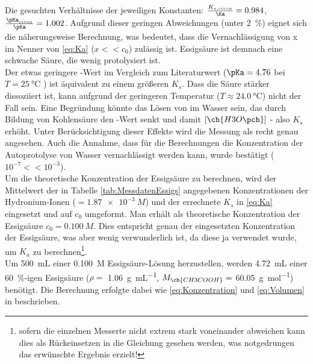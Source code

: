 \documentclass{article}
\begin{document}
         Die gesuchten Verhältnisse der jeweiligen Konstanten: $\frac{K_{s,circa}}{\Ka} = 0.984$, $\frac{\pKa _{circa}}{\pKa} = 1.002$. Aufgrund dieser geringen Abweichungen (unter \SI[mode=text]{2}{\percent}) eignet sich die näherungsweise Berechnung, was bedeutet, dass die Vernachlässigung von x im Nenner von \eqref{eq:Ka} ($x << c_{0}$) zulässig ist. Essigsäure ist demnach eine schwache Säure, die wenig protolysiert ist.\\
         
         Der etwas geringere \pKa-Wert im Vergleich zum Literaturwert ($\pKa = 4.76$ bei $T = \SI[mode=text]{25}{\degreeCelsius}$ \cite{Essigsaure}) ist äquivalent zu einem größeren $K_{s}$. Dass die Säure stärker dissoziiert ist, kann aufgrund der geringeren Temperatur ($T \approx \SI[mode=text]{24.0}{\degreeCelsius}$) nicht der Fall sein. Eine Begründung könnte das Lösen von  im Wasser sein, das durch Bildung von Kohlensäure den \pH-Wert senkt und damit $[\ch{H3O\pch}]$ - also $K_{s}$ erhöht. Unter Berücksichtigung dieser Effekte wird die Messung als recht genau angesehen. Auch die Annahme, dass für die Berechnungen die  Konzentration der Autoprotolyse von Wasser vernachlässigt werden kann, wurde bestätigt ($10^{-7} << 10^{-3}$). \\
         
         Um die theoretische Konzentration der Essigsäure zu berechnen, wird der Mittelwert der in Tabelle \ref{tab:MessdatenEssigs} angegebenen Konzentrationen der Hydronium-Ionen ($= \SI[mode=text]{1.87e-3}{M}$) und der errechnete $K_{s}$ in \eqref{eq:Ka} eingesetzt und auf $c_{0}$ umgeformt. Man erhält als theoretische Konzentration der Essigsäure $c_{0} = \SI[mode=text]{0.100}{M}$. Dies entspricht genau der eingesetzten Konzentration der Essigsäure, was aber wenig verwunderlich ist, da diese ja verwendet wurde, um $K_{a}$ zu berechnen\footnote{sofern die einzelnen Messerte nicht extrem stark voneinander abweichen kann dies als Rückeinsetzen in die Gleichung gesehen werden, was notgedrungen das erwünschte Ergebnis erzielt!}. \\
         
         Um \SI[mode=text]{500}{\milli\liter} einer \SI[mode=text]{0.100}{M} Essigsäure-Lösung herzustellen, werden \SI[mode=text]{4.72}{\milli\liter} einer \SI[mode=text]{60}{\percent}-igen Essigsäure ($\rho = $ \SI[mode=text]{1.06}{\gram\per\milli\liter}, $M_{\ch{CH3COOH}} = $ \SI[mode=text]{60.05}{\g\per\mole}) benötigt. Die Berechnung erfolgte dabei wie \eqref{eq:Konzentration} und \eqref{eq:Volumen} in beschrieben.
       
\end{document}
